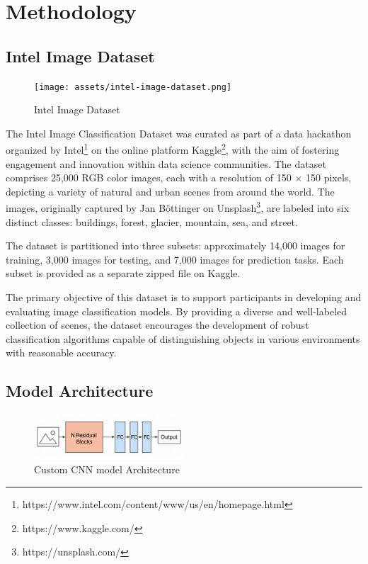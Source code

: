 \section{Methodology}

\subsection{Intel Image Dataset}

\begin{figure}[ht]
    \centering
    \texttt{[image: assets/intel-image-dataset.png]}
    \caption{Intel Image Dataset}
    \label{fig:dataset}
\end{figure}

The Intel Image Classification Dataset \cite{intel_image_classification_kaggle} was curated
as part of a data hackathon organized
by Intel\footnote{https://www.intel.com/content/www/us/en/homepage.html}
on the online platform Kaggle\footnote{https://www.kaggle.com/},
with the aim of fostering engagement and innovation within data science communities.
The dataset comprises 25,000 RGB color images,
each with a resolution of 150 $\times$ 150 pixels,
depicting a variety of natural and urban scenes from around the world.
The images, originally captured by Jan Böttinger
on Unsplash\footnote{https://unsplash.com/},
are labeled into six distinct classes: buildings, forest, glacier, mountain, sea, and street.

The dataset is partitioned into three subsets: approximately 14,000 images for training,
3,000 images for testing, and 7,000 images for prediction tasks.
Each subset is provided as a separate zipped file on Kaggle.

The primary objective of this dataset is to support participants
in developing and evaluating image classification models.
By providing a diverse and well-labeled collection of scenes,
the dataset encourages the development of robust classification algorithms
capable of distinguishing objects in various environments with reasonable accuracy.

\subsection{Model Architecture}
\label{sec:method:model_architecture}

\begin{figure}[ht]
    \centering
    \includegraphics[width=0.5\textwidth]{assets/model-architecture.png}
    \caption{Custom CNN model Architecture}
    \label{fig:model_architecture}
\end{figure}

